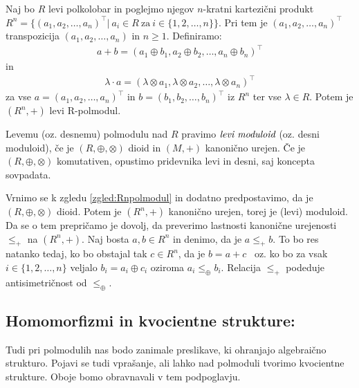 \documentclass[mat1]{fmfdelo}
\newcommand{\pojem}[1]{\ensuremath{\emph{#1}}}
\begin{document}
\begin{zgled}
	\label{zgled:Rnpolmodul}
	Naj bo $R$ levi polkolobar in poglejmo njegov $n$-kratni kartezični produkt $R^n = \{(a_1, a_2, \ldots, a_n)^{\top} |~ a_i \in R~\text{za}~i\in \{1, 2, \ldots, n\}\}$. Pri tem je $(a_1, a_2, \ldots, a_n)^{\top}$ transpozicija $(a_1, a_2, \ldots, a_n)$ in $n\geq 1$. Definiramo:
	\begin{align*}
		a + b = (a_1 \oplus b_1, a_2 \oplus b_2, \ldots, a_n \oplus b_n)^{\top}
	\end{align*}
	in
	\begin{align*}
		\lambda\cdot a = (\lambda\otimes a_1,\lambda\otimes a_2, \ldots,\lambda\otimes a_n)^{\top}
	\end{align*}
	za vse $a = (a_1, a_2, \ldots, a_n)^{\top}$ in $b = (b_1, b_2, \ldots, b_n)^{\top}$ iz $R^n$ ter vse $\lambda \in R$. Potem je $(R^n, +)$ levi R-polmodul.
\end{zgled}

\begin{definicija}
	Levemu (oz. desnemu) polmodulu nad $R$ pravimo \pojem{levi~moduloid} (oz. desni moduloid), če je $(R, \oplus, \otimes)$ dioid in $(M, +)$ kanonično urejen. Če je $(R, \oplus, \otimes)$ komutativen, opustimo pridevnika levi in desni, saj koncepta sovpadata.
\end{definicija}

\begin{zgled}
	Vrnimo se k zgledu \ref{zgled:Rnpolmodul} in dodatno predpostavimo, da je $(R, \oplus, \otimes)$ dioid. Potem je $(R^n, +)$ kanonično urejen, torej je (levi) moduloid.
	Da se o tem prepričamo je dovolj, da preverimo lastnosti kanonične urejenosti $\leq_+$ na $(R^n, +)$. Naj bosta $a, b \in R^n$ in denimo, da je $a \leq_+ b$. To bo res natanko tedaj, ko bo obstajal tak $c\in R^n$, da je $b = a + c$~ oz. ko bo za vsak $i\in \{1, 2, \ldots, n\}$ veljalo $b_i = a_i \oplus c_i$ oziroma $a_i \leq_\oplus b_i$. Relacija $\leq_+$ podeduje antisimetričnost od $\leq_\oplus$.
\end{zgled}

\subsection{Homomorfizmi in kvocientne strukture:} Tudi pri polmodulih nas bodo zanimale preslikave, ki ohranjajo algebraično strukturo. Pojavi se tudi vprašanje, ali lahko nad polmoduli tvorimo kvocientne strukture. Oboje bomo obravnavali v tem podpoglavju.
\end{document}

